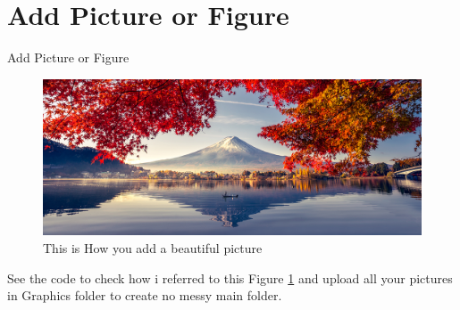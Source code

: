 \documentclass[aspectratio=169, 9pt]{beamer}
\begin{document}
\section{Add Picture or Figure}

\begin{frame}{Add Picture or Figure}
        \begin{minipage}[t]{\linewidth}
            \begin{center}
            \begin{figure}
                \centering
                \includegraphics[width=0.7\linewidth]{./Graphics/BeautifulPicture.jpg}
             \caption{This is How you add a beautiful picture}
                \label{BFigure1} %
            \end{figure}
            \end{center}
        \end{minipage}
        See the code to check how i referred to this Figure \ref{BFigure1} and upload all your pictures in Graphics folder to create no messy main folder.
\end{frame}

%
%
\end{document}
